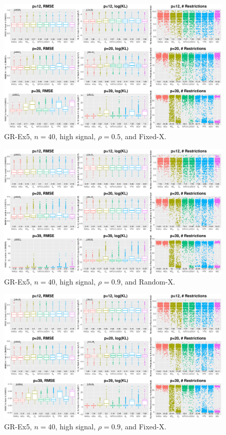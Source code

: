 \begin{figure}[!ht]
\centering
\includegraphics[width=\textwidth]{figures/supplement/fixedx_GR-Ex5_n40_hsnr_rho05.eps}
\caption{GR-Ex5, $n=40$, high signal, $\rho=0.5$, and Fixed-X.}
\end{figure}
\clearpage
\begin{figure}[!ht]
\centering
\includegraphics[width=\textwidth]{figures/supplement/randomx_GR-Ex5_n40_hsnr_rho09.eps}
\caption{GR-Ex5, $n=40$, high signal, $\rho=0.9$, and Random-X.}
\end{figure}
\begin{figure}[!ht]
\centering
\includegraphics[width=\textwidth]{figures/supplement/fixedx_GR-Ex5_n40_hsnr_rho09.eps}
\caption{GR-Ex5, $n=40$, high signal, $\rho=0.9$, and Fixed-X.}
\end{figure}
